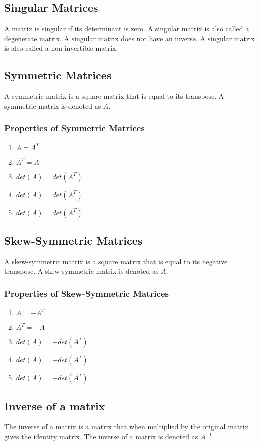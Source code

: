 \documentclass[titlepage,a4paper]{article}
\begin{document}
	\subsection{Singular Matrices}
		A matrix is singular if its determinant is zero. A singular matrix is also called a degenerate matrix. A singular matrix does not have an inverse. A singular matrix is also called a non-invertible matrix.
	
	\subsection{Symmetric Matrices}
		A symmetric matrix is a square matrix that is equal to its transpose. A symmetric matrix is denoted as $A$.
		\subsubsection{Properties of Symmetric Matrices}
			\begin{enumerate}
				\item $A = A^T$
				\item $A^T = A$
				\item $det(A) = det(A^T)$
				\item $det(A) = det(A^T)$
				\item $det(A) = det(A^T)$
			\end{enumerate}
	\subsection{Skew-Symmetric Matrices}
		A skew-symmetric matrix is a square matrix that is equal to its negative transpose. A skew-symmetric matrix is denoted as $A$.
		\subsubsection{Properties of Skew-Symmetric Matrices}
			\begin{enumerate}
				\item $A = -A^T$
				\item $A^T = -A$
				\item $det(A) = -det(A^T)$
				\item $det(A) = -det(A^T)$
				\item $det(A) = -det(A^T)$
			\end{enumerate}
	\subsection{Inverse of a matrix}
		The inverse of a matrix is a matrix that when multiplied by the original matrix gives the identity matrix. The inverse of a matrix is denoted as $A^{-1}$.
\end{document}
